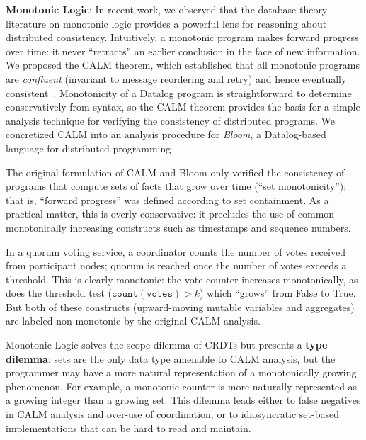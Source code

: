 
\vspace{0.5em} \noindent
\textbf{Monotonic Logic}: In recent work, we observed that the database theory
literature on monotonic logic provides a powerful lens for reasoning about
distributed consistency. Intuitively, a monotonic program makes forward progress
over time: it never ``retracts'' an earlier conclusion in the face of new
information. We proposed the CALM theorem, which established that all monotonic
programs are \emph{confluent} (invariant to message reordering and retry) and
hence eventually
consistent~\cite{Ameloot2011,Hellerstein2010,dedalus-confluence}. Monotonicity
of a Datalog program is straightforward to determine conservatively from syntax,
so the CALM theorem provides the basis for a simple analysis technique for
verifying the consistency of distributed programs. We concretized CALM into an
analysis procedure for \emph{Bloom}, a Datalog-based language for distributed
programming~\cite{Alvaro2011,bloom}

The original formulation of CALM and Bloom only verified the consistency of
programs that compute sets of facts that grow over time (``set monotonicity'');
that is, ``forward progress'' was defined according to set containment. As a
practical matter, this is overly conservative: it precludes the use of common
monotonically increasing constructs such as timestamps and sequence numbers.

\vspace{-0.25em}
\begin{example}  In a
quorum voting service, a coordinator counts the number of votes received
from participant nodes; quorum is reached once the number of votes exceeds a
threshold. This is clearly monotonic: the vote counter increases
monotonically, as does the threshold test ($\mathtt{count(votes)} > k$) which ``grows'' from False to True. But both of these constructs (upward-moving
mutable variables and aggregates) are labeled non-monotonic by the
original CALM analysis.
\end{example}

\vspace{-.25em}
Monotonic Logic solves the scope dilemma of CRDTs but presents a \textbf{type dilemma}: sets are the only data type amenable to CALM analysis, but the programmer may have a more natural representation of a monotonically growing phenomenon. For example, a monotonic counter is more naturally represented as a growing integer than a growing set. This dilemma leads either to false negatives in CALM analysis and over-use of coordination, or to idiosyncratic set-based implementations that can be hard to read and maintain.

